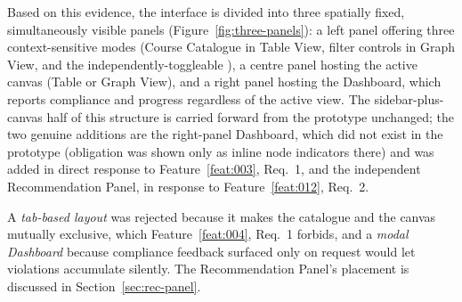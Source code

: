 Based on this evidence, the interface is divided into three spatially fixed, simultaneously visible panels (Figure~\ref{fig:three-panels}): a left panel offering three context-sensitive modes (Course Catalogue in Table View, filter controls in Graph View, and the independently-toggleable ), a centre panel hosting the active canvas (Table or Graph View), and a right panel hosting the Dashboard, which reports compliance and progress regardless of the active view. The sidebar-plus-canvas half of this structure is carried forward from the prototype unchanged; the two genuine additions are the right-panel Dashboard, which did not exist in the prototype (obligation was shown only as inline node indicators there) and was added in direct response to Feature~\ref{feat:003}, Req.~1, and the independent Recommendation Panel, in response to Feature~\ref{feat:012}, Req.~2.

A \emph{tab-based layout} was rejected because it makes the catalogue and the canvas mutually exclusive, which Feature~\ref{feat:004}, Req.~1 forbids, and a \emph{modal Dashboard} because compliance feedback surfaced only on request would let violations accumulate silently. The Recommendation Panel's placement is discussed in Section~\ref{sec:rec-panel}.

